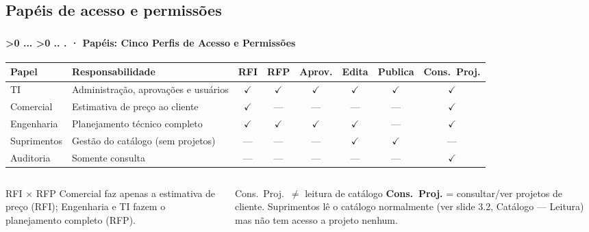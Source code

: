 \documentclass[aspectratio=169,10pt]{beamer}
\newcommand{\yes}{\textcolor{mlgreen}{$\checkmark$}}
\newcommand{\no}{\textcolor{mlred}{---}}
\newcounter{mlc3}[subsection]
\newcounter{mlc4}[mlc3]
\newcommand{\pathnum}{%
  \ifnum\value{mlc4}>0
    \thesection.\thesubsection.\arabic{mlc3}.\arabic{mlc4}%
  \else\ifnum\value{mlc3}>0
    \thesection.\thesubsection.\arabic{mlc3}%
  \else
    \thesection.\thesubsection%
  \fi\fi
}
\newcommand{\mtitle}[1]{%
  \frametitle{\insertsection}%
  \framesubtitle{\pathnum\;·\; #1}}
\begin{document}
\subsection{Papéis de acesso e permissões}
\begin{frame}
  \mtitle{Papéis: Cinco Perfis de Acesso e Permissões}
  \renewcommand{\arraystretch}{1.2}
  \begin{tabularx}{\textwidth}{@{}l X c c c c c c@{}}
    \hline
    \textbf{Papel} & \textbf{Responsabilidade} & \textbf{RFI} & \textbf{RFP} & \textbf{Aprov.} & \textbf{Edita} & \textbf{Publica} & \textbf{Cons.\ Proj.} \\
    \hline
    TI          & Administração, aprovações e usuários  & \yes & \yes & \yes & \yes & \yes & \yes \\
    Comercial   & Estimativa de preço ao cliente        & \yes & \no  & \no  & \no  & \no  & \yes \\
    Engenharia  & Planejamento técnico completo         & \yes & \yes & \yes & \yes & \no  & \yes \\
    Suprimentos & Gestão do catálogo (sem projetos)     & \no  & \no  & \no  & \yes & \yes & \no  \\
    Auditoria   & Somente consulta                      & \no  & \no  & \no  & \no  & \no  & \yes \\
    \hline
  \end{tabularx}
  \vspace{6pt}
  \begin{columns}[T]
    \begin{alertblock}{\small RFI $\times$ RFP}
      \scriptsize Comercial faz apenas a estimativa de preço (RFI);
      Engenharia e TI fazem o planejamento completo (RFP).
    \end{alertblock}
    \begin{exampleblock}{\small Cons.\ Proj.\ $\neq$ leitura de catálogo}
      \scriptsize \textbf{Cons.\ Proj.} = consultar/ver projetos de cliente.
      Suprimentos lê o catálogo normalmente (ver slide 3.2, Catálogo ---
      Leitura) mas não tem acesso a projeto nenhum.
    \end{exampleblock}
  \end{columns}
\end{frame}
\end{document}
